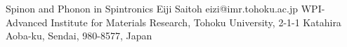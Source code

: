 \begin{conf-abstract}[]
{Spinon and Phonon in Spintronics}
{\color{blue} Eiji Saitoh}
{eizi@imr.tohoku.ac.jp}
{WPI-Advanced Institute for Materials Research, Tohoku University, 2-1-1 Katahira Aoba-ku, Sendai, 980-8577, Japan}
{\decofourleft \decofourright}





\printbibliography[heading=none]

\end{conf-abstract}
